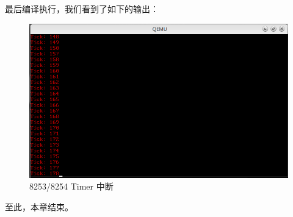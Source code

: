 \par 最后编译执行，我们看到了如下的输出：
\begin{figure}[H]
      \centering
      \includegraphics[scale=0.6]{picture/chapt8/8253_TIMER.png}
      \caption{8253/8254 Timer 中断}
\end{figure}

\par 至此，本章结束。

